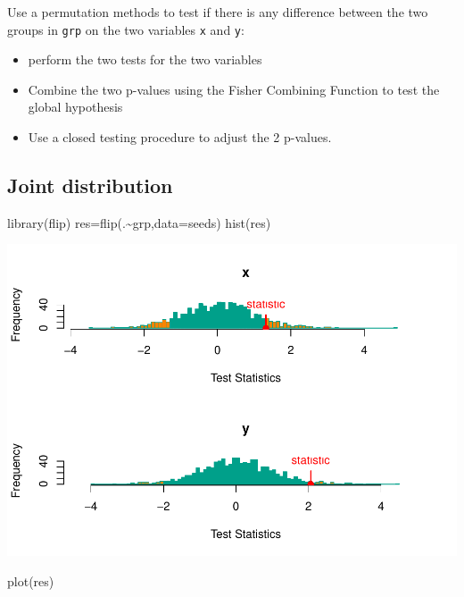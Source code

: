 \documentclass[
]{article}
\newenvironment{Shaded}{\begin{snugshade}}{\end{snugshade}}
\newcommand{\AttributeTok}[1]{\textcolor[rgb]{0.77,0.63,0.00}{#1}}
\newcommand{\FunctionTok}[1]{\textcolor[rgb]{0.00,0.00,0.00}{#1}}
\newcommand{\NormalTok}[1]{#1}
\newcommand{\OtherTok}[1]{\textcolor[rgb]{0.56,0.35,0.01}{#1}}
\newcommand{\SpecialCharTok}[1]{\textcolor[rgb]{0.00,0.00,0.00}{#1}}
\providecommand{\tightlist}{%
  \setlength{\itemsep}{0pt}\setlength{\parskip}{0pt}}
\begin{document}
Use a permutation methods to test if there is any difference between the
two groups in \texttt{grp} on the two variables \texttt{x} and
\texttt{y}:

\begin{itemize}
\tightlist
\item
  perform the two tests for the two variables
\item
  Combine the two p-values using the Fisher Combining Function to test
  the global hypothesis
\item
  Use a closed testing procedure to adjust the 2 p-values.
\end{itemize}

\hypertarget{joint-distribution}{%
\subsection{Joint distribution}\label{joint-distribution}}

\begin{Shaded}
\begin{Highlighting}[]
\FunctionTok{library}\NormalTok{(flip)}
\NormalTok{res}\OtherTok{=}\FunctionTok{flip}\NormalTok{(.}\SpecialCharTok{\textasciitilde{}}\NormalTok{grp,}\AttributeTok{data=}\NormalTok{seeds)}
\FunctionTok{hist}\NormalTok{(res)}
\end{Highlighting}
\end{Shaded}

\begin{center}\includegraphics{perm_files/figure-latex/unnamed-chunk-35-1} \end{center}

\begin{Shaded}
\begin{Highlighting}[]
\FunctionTok{plot}\NormalTok{(res)}
\end{Highlighting}
\end{Shaded}
\end{document}
